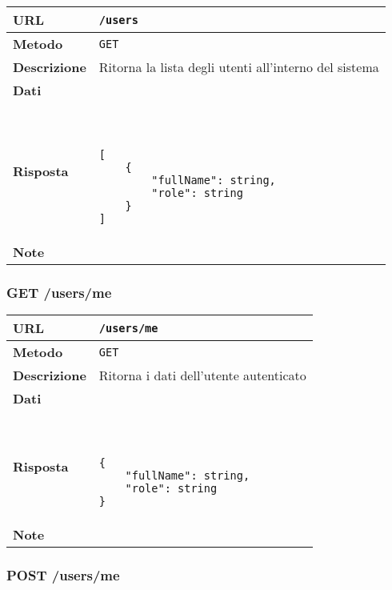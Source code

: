 \documentclass[12pt,a4paper]{article}
\begin{document}
            \begin{tabular}{|l|l|} 
                \hline
                \textbf{URL} & \texttt{/users} \\ \hline
                \textbf{Metodo} & \texttt{GET} \\ \hline
                \textbf{Descrizione} & 
                    Ritorna la lista degli utenti all'interno del sistema \\ \hline
                \textbf{Dati} & \\ \hline
                \textbf{Risposta} & \
                    \begin{lstlisting}[basicstyle={\ttfamily}]
[
    {
        "fullName": string,
        "role": string
    }
]
                    \end{lstlisting} \\ \hline
                \textbf{Note} & \\ \hline
            \end{tabular}

        \subsubsection{GET /users/me}

            \begin{tabular}{|l|l|} 
                \hline
                \textbf{URL} & \texttt{/users/me} \\ \hline
                \textbf{Metodo} & \texttt{GET} \\ \hline
                \textbf{Descrizione} & 
                    Ritorna i dati dell'utente autenticato \\ \hline
                \textbf{Dati} & \\ \hline
                \textbf{Risposta} & \
                    \begin{lstlisting}[basicstyle={\ttfamily}]
{
    "fullName": string,
    "role": string
}
                    \end{lstlisting} \\ \hline
                \textbf{Note} & \\ \hline
            \end{tabular}

        \subsubsection{POST /users/me}
\end{document}
